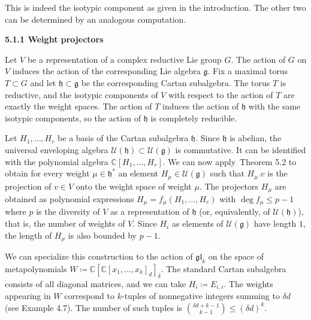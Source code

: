 This is indeed the isotypic component as given in the introduction.
The other two can be determined by an analogous computation.







\par\medskip\noindent\textbf{5.1.1 Weight projectors}\par




Let $V$ be a representation of a complex reductive Lie group $G$.
The action of $G$ on $V$ induces the action of the corresponding Lie algebra $\mathfrak{g}$.
Fix a maximal torus $T\subset G$ and let $\mathfrak{h}\subset\mathfrak{g}$ be the corresponding Cartan subalgebra.
The torus $T$ is reductive, and the isotypic components of $V$ with respect to the action of $T$ are exactly the weight spaces.
The action of $T$ induces the action of $\mathfrak{h}$ with the same isotypic components, so the action of $\mathfrak{h}$ is completely reducible.





Let $H_{1},\dots,H_{r}$ be a basis of the Cartan subalgebra $\mathfrak{h}$.
Since $\mathfrak{h}$ is abelian, the universal enveloping algebra $\mathcal{U}(\mathfrak{h})\subset\mathcal{U}(\mathfrak{g})$ is commutative.
It can be identified with the polynomial algebra $\mathbb{C}[H_{1},\dots,H_{r}]$.
We can now apply Theorem 5.2 to obtain for every weight $\mu\in\mathfrak{h}^{*}$ an element $H_{\mu}\in\mathcal{U}(\mathfrak{g})$ such that $H_{\mu}.v$ is the projection of $v\in V$ onto the weight space of weight $\mu$.
The projectors $H_{\mu}$ are obtained as polynomial expressions $H_{\mu}=f_{\mu}(H_{1},\dots,H_{r})$ with $\deg f_{\mu}\leq p-1$ where $p$ is the diversity of $V$ as a representation of $\mathfrak{h}$ (or, equivalently, of $\mathcal{U}(\mathfrak{h})$), that is, the number of weights of $V$.
Since $H_{i}$ as elements of $\mathcal{U}(\mathfrak{g})$ have length $1$, the length of $H_{\mu}$ is also bounded by $p-1$.





We can specialize this construction to the action of $\mathfrak{gl}_{k}$ on the space of metapolynomials $W\coloneqq\mathbb{C}[\mathbb{C}[x_{1},\ldots,x_{k}]_{d}]_{\delta}$.
The standard Cartan subalgebra consists of all diagonal matrices, and we can take $H_{i}\coloneqq E_{i,i}$.
The weights appearing in $W$ correspond to $k$-tuples of nonnegative integers summing to $\delta d$ (see Example 4.7). The number of such tuples is $\binom{\delta d+k-1}{k-1}\leq(\delta d)^{k}$.





